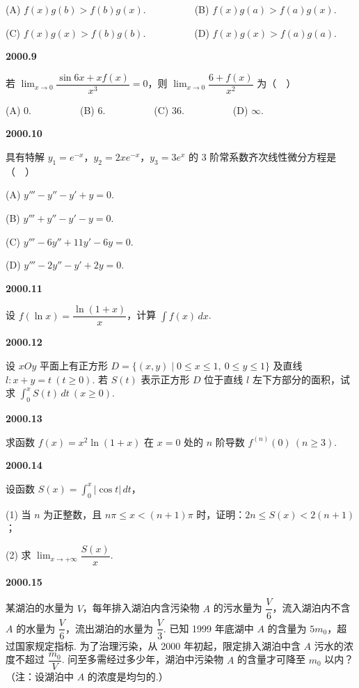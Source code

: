 \documentclass[UTF8,12pt,fontset=windows]{ctexart}
\begin{document}
(A) $f(x)g(b) > f(b)g(x)$.　　　　　(B) $f(x)g(a) > f(a)g(x)$.

(C) $f(x)g(x) > f(b)g(b)$.　　　　　(D) $f(x)g(x) > f(a)g(a)$.

\vfill
\newpage
{\large\bfseries 2000.9}

若 $\lim_{x \to 0} \dfrac{\sin 6x + xf(x)}{x^3} = 0$，则 $\lim_{x \to 0} \dfrac{6 + f(x)}{x^2}$ 为（　）

(A) 0.　　　　　(B) 6.　　　　　(C) 36.　　　　　(D) $\infty$.

\vfill
\newpage
{\large\bfseries 2000.10}

具有特解 $y_1 = e^{-x}$，$y_2 = 2xe^{-x}$，$y_3 = 3e^x$ 的 3 阶常系数齐次线性微分方程是（　）

(A) $y''' - y'' - y' + y = 0$.

(B) $y''' + y'' - y' - y = 0$.

(C) $y''' - 6y'' + 11y' - 6y = 0$.

(D) $y''' - 2y'' - y' + 2y = 0$.

\vfill
\newpage
{\large\bfseries 2000.11}

设 $f(\ln x) = \dfrac{\ln(1 + x)}{x}$，计算 $\int f(x) \, dx$.

\vfill
\newpage
{\large\bfseries 2000.12}

设 $xOy$ 平面上有正方形 $D = \{(x,y) \mid 0 \leqslant x \leqslant 1,\ 0 \leqslant y \leqslant 1\}$ 及直线 $l: x + y = t \ (t \geqslant 0)$. 若 $S(t)$ 表示正方形 $D$ 位于直线 $l$ 左下方部分的面积，试求 $\int_0^x S(t) \, dt \ (x \geqslant 0)$.

\vfill
\newpage
{\large\bfseries 2000.13}

求函数 $f(x) = x^2 \ln(1 + x)$ 在 $x = 0$ 处的 $n$ 阶导数 $f^{(n)}(0) \ (n \geqslant 3)$.

\vfill
\newpage
{\large\bfseries 2000.14}

设函数 $S(x) = \int_0^x |\cos t| \, dt$，

(1) 当 $n$ 为正整数，且 $n\pi \leqslant x < (n + 1)\pi$ 时，证明：$2n \leqslant S(x) < 2(n + 1)$；

(2) 求 $\lim_{x \to +\infty} \dfrac{S(x)}{x}$.

\vfill
\newpage
{\large\bfseries 2000.15}

某湖泊的水量为 $V$，每年排入湖泊内含污染物 $A$ 的污水量为 $\dfrac{V}{6}$，流入湖泊内不含 $A$ 的水量为 $\dfrac{V}{6}$，流出湖泊的水量为 $\dfrac{V}{3}$. 已知 1999 年底湖中 $A$ 的含量为 $5m_0$，超过国家规定指标. 为了治理污染，从 2000 年初起，限定排入湖泊中含 $A$ 污水的浓度不超过 $\dfrac{m_0}{V}$. 问至多需经过多少年，湖泊中污染物 $A$ 的含量才可降至 $m_0$ 以内？（注：设湖泊中 $A$ 的浓度是均匀的.）
\end{document}
